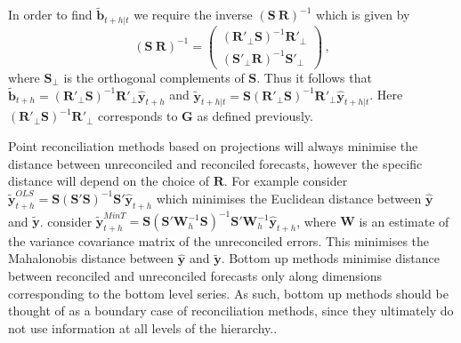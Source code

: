 \documentclass[a4paper, 11pt]{article}
\theoremstyle{theo}
\theoremstyle{definition}
\begin{document}

In order to find $\tilde{\bm{b}}_{t+h|t}$ we require the inverse $(\bm{S} ~ \bm{R})^{-1}$ which is given by
\begin{equation}
(\bm{S} ~  \bm{R})^{-1} = \begin{pmatrix}
(\bm{R}'_\bot \bm{S})^{-1}\bm{R}'_\bot \\ (\bm{S}'_\bot \bm{R})^{-1}\bm{S}'_\bot
\end{pmatrix}\,,
\end{equation}
where $\bm{S}_{\bot}$ is the orthogonal complements of $\bm{S}$. Thus it follows that $\tilde{\bm{b}}_{t+h}=(\bm{R}'_\bot \bm{S})^{-1}\bm{R}'_\bot \hat{\bm{y}}_{t+h}$ and $\tilde{\bm{y}}_{t+h|t}=\bm{S}(\bm{R}'_\bot \bm{S})^{-1}\bm{R}'_\bot \hat{\bm{y}}_{t+h|t}$.  Here $(\bm{R}'_\bot \bm{S})^{-1}\bm{R}'_\bot$ corresponds to $\bm{G}$ as defined previously.

Point reconciliation methods based on projections will always minimise the distance between unreconciled and reconciled forecasts, however the specific distance will depend on the choice of ${\bm R}$.  For example \cite{Hyndman2011} consider $\tilde{\bm{y}}^{OLS}_{t+h}=\bm{S}(\bm{S}' \bm{S})^{-1}\bm{S}' \hat{\bm{y}}_{t+h}$ which minimises the Euclidean distance between $\hat{\bm y}$ and $\tilde{\bm y}$. \cite{Wickramasuriya2017} consider $\tilde{\bm{y}}^{MinT}_{t+h}=\bm{S}(\bm{S}' \bm{W}^{-1}_{h}\bm{S})^{-1}\bm{S}'\bm{W}^{-1}_{h} \hat{\bm{y}}_{t+h}$, where ${\bm W}$ is an estimate of the variance covariance matrix of the unreconciled errors.  This 
minimises the Mahalonobis distance between $\hat{\bm y}$ and $\tilde{\bm y}$.  Bottom up methods minimise distance between reconciled and unreconciled forecasts only along dimensions corresponding to the bottom level series.  As such, bottom up methods should be thought of as a boundary case of reconciliation methods, since they ultimately do not use information at all levels of the hierarchy..

\end{document}
